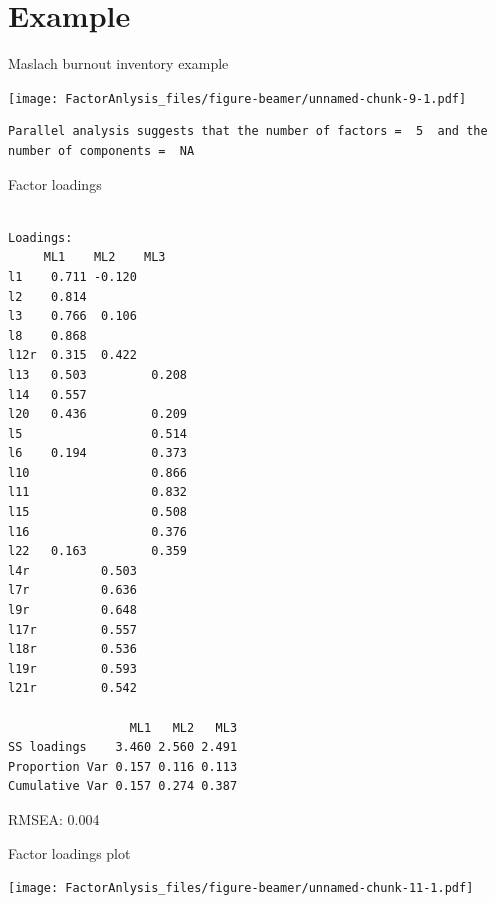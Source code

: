 \documentclass[10pt,ignorenonframetext,]{beamer}
\begin{document}
\section{Example}\label{example}

\begin{frame}[fragile]{Maslach burnout inventory example}

\texttt{[image: FactorAnlysis\_files/figure-beamer/unnamed-chunk-9-1.pdf]}

\begin{verbatim}
Parallel analysis suggests that the number of factors =  5  and the number of components =  NA 
\end{verbatim}

\end{frame}

\begin{frame}[fragile]{Factor loadings}

\tiny

\begin{verbatim}

Loadings:
     ML1    ML2    ML3   
l1    0.711 -0.120       
l2    0.814              
l3    0.766  0.106       
l8    0.868              
l12r  0.315  0.422       
l13   0.503         0.208
l14   0.557              
l20   0.436         0.209
l5                  0.514
l6    0.194         0.373
l10                 0.866
l11                 0.832
l15                 0.508
l16                 0.376
l22   0.163         0.359
l4r          0.503       
l7r          0.636       
l9r          0.648       
l17r         0.557       
l18r         0.536       
l19r         0.593       
l21r         0.542       

                 ML1   ML2   ML3
SS loadings    3.460 2.560 2.491
Proportion Var 0.157 0.116 0.113
Cumulative Var 0.157 0.274 0.387
\end{verbatim}

RMSEA: 0.004

\end{frame}

\begin{frame}{Factor loadings plot}

\texttt{[image: FactorAnlysis\_files/figure-beamer/unnamed-chunk-11-1.pdf]}

\end{frame}
\end{document}
